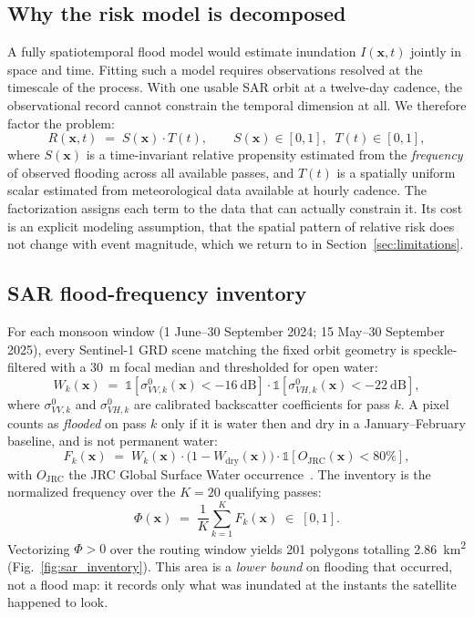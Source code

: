 \documentclass[10pt,twocolumn]{article}
\newcommand{\Sx}{S(\mathbf{x})}
\newcommand{\Tt}{T(t)}
\newcommand{\Rxt}{R(\mathbf{x},t)}
\begin{document}
\subsection{Why the risk model is decomposed}
\label{sec:method-decomp}
A fully spatiotemporal flood model would estimate inundation
$I(\mathbf{x},t)$ jointly in space and time. Fitting such a model requires
observations resolved at the timescale of the process. With one usable SAR orbit
at a twelve-day cadence, the observational record cannot constrain the temporal
dimension at all. We therefore factor the problem:
\begin{equation}
\Rxt \;=\; \Sx \cdot \Tt,
\qquad \Sx\in[0,1],\;\; \Tt\in[0,1],
\label{eq:fusion}
\end{equation}
where $\Sx$ is a time-invariant relative propensity estimated from the
\emph{frequency} of observed flooding across all available passes, and $\Tt$ is a
spatially uniform scalar estimated from meteorological data available at hourly
cadence. The factorization assigns each term to the data that can actually
constrain it. Its cost is an explicit modeling assumption, that the spatial
pattern of relative risk does not change with event magnitude, which we return to
in Section~\ref{sec:limitations}.

\subsection{SAR flood-frequency inventory}
For each monsoon window (1 June--30 September 2024; 15 May--30 September 2025),
every Sentinel-1 GRD scene matching the fixed orbit geometry is speckle-filtered
with a \SI{30}{\metre} focal median and thresholded for open water:
\begin{equation}
W_k(\mathbf{x}) \;=\;
\mathbb{1}\!\left[\sigma^0_{VV,k}(\mathbf{x}) < \SI{-16}{\deci\bel}\right]\cdot
\mathbb{1}\!\left[\sigma^0_{VH,k}(\mathbf{x}) < \SI{-22}{\deci\bel}\right],
\label{eq:water}
\end{equation}
where $\sigma^0_{VV,k}$ and $\sigma^0_{VH,k}$ are calibrated backscatter
coefficients for pass $k$. A pixel counts as \emph{flooded} on pass $k$ only if it
is water then and dry in a January--February baseline, and is not permanent water:
\begin{equation}
F_k(\mathbf{x}) \;=\; W_k(\mathbf{x})\cdot\bigl(1-W_{\text{dry}}(\mathbf{x})\bigr)
\cdot\mathbb{1}\!\left[O_{\text{JRC}}(\mathbf{x}) < 80\%\right],
\label{eq:floodpass}
\end{equation}
with $O_{\text{JRC}}$ the JRC Global Surface Water occurrence~\citep{pekel2016}.
The inventory is the normalized frequency over the $K=20$ qualifying passes:
\begin{equation}
\Phi(\mathbf{x}) \;=\; \frac{1}{K}\sum_{k=1}^{K} F_k(\mathbf{x}) \;\in\; [0,1].
\label{eq:freq}
\end{equation}
Vectorizing $\Phi>0$ over the routing window yields 201 polygons totalling
\SI{2.86}{\kilo\metre\squared} (Fig.~\ref{fig:sar_inventory}). This area is a
\emph{lower bound} on flooding that occurred, not a flood map: it records only
what was inundated at the instants the satellite happened to look.
\end{document}
